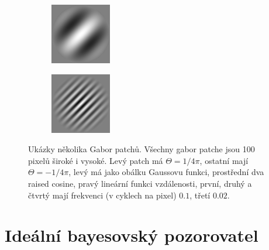 \begin{figure}[h!]
\begin{subfigure}{0.25\textwidth}
\end{subfigure}%
\begin{subfigure}{0.25\textwidth}
  \centering
  \includegraphics[width=.8\linewidth]{img/gabor3}
\end{subfigure}%
\begin{subfigure}{0.25\textwidth}
  \centering
  \includegraphics[width=.8\linewidth]{img/gabor4}
\end{subfigure}%
\caption{Ukázky několika Gabor patchů. Všechny gabor patche jsou 100 pixelů široké i vysoké. Levý patch má $\Theta = 1/4\pi$, ostatní mají $\Theta = -1/4\pi$, levý má jako obálku Gaussovu funkci, prostřední dva raised cosine, pravý lineární funkci vzdálenosti, první, druhý a čtvrtý mají frekvenci (v cyklech na pixel) $0.1$, třetí $0.02$.} 
\label{obr:gabor:example} 
 
\end{figure}


\section{Ideální bayesovský pozorovatel}
